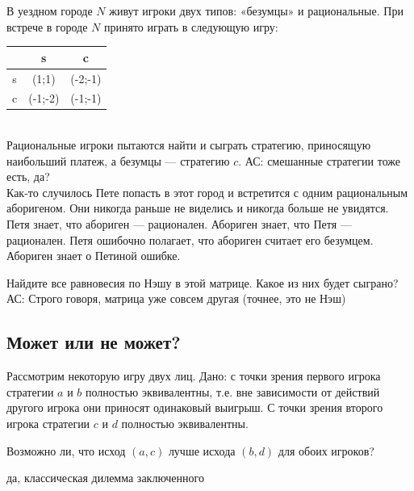 \begin{problem} 

В уездном городе  $N$  живут игроки двух типов: «безумцы» и рациональные. При встрече в городе  $N$  принято играть в следующую игру:\\
\begin{tabular}{|c|c|c|}
			\hline
			& s & c \\
			\hline
			s & (1;1) & (-2;-1) \\
			c & (-1;-2) & (-1;-1) \\
			\hline
\end{tabular} \\
Рациональные игроки пытаются найти и сыграть стратегию, приносящую наибольший платеж, а безумцы — стратегию  $c$. {\red АС: смешанные стратегии тоже есть, да?}\\
Как-то случилось Пете попасть в этот город и встретится с одним рациональным аборигеном. Они никогда раньше не виделись и никогда больше не увидятся. Петя знает, что абориген — рационален. Абориген знает, что Петя — рационален. Петя ошибочно полагает, что абориген считает его безумцем. Абориген знает о Петиной ошибке.

Найдите все равновесия по Нэшу в этой матрице. Какое из них будет сыграно?
{\red АС: Строго говоря, матрица уже совсем другая (точнее, это не Нэш)}



\begin{sol}

\end{sol}
\end{problem}



\subsection{Может или не может?}


\begin{problem}
Рассмотрим некоторую игру двух лиц. Дано: с точки зрения первого игрока стратегии $a$ и $b$ полностью
эквивалентны, т.е. вне зависимости от действий другого игрока они
приносят одинаковый выигрыш. С точки зрения второго игрока
стратегии $c$ и $d$ полностью эквивалентны. \par
Возможно ли, что исход $(a,c)$ лучше исхода $(b,d)$ для обоих
игроков?



\begin{sol}
да, классическая дилемма заключенного
\end{sol}
\end{problem}

